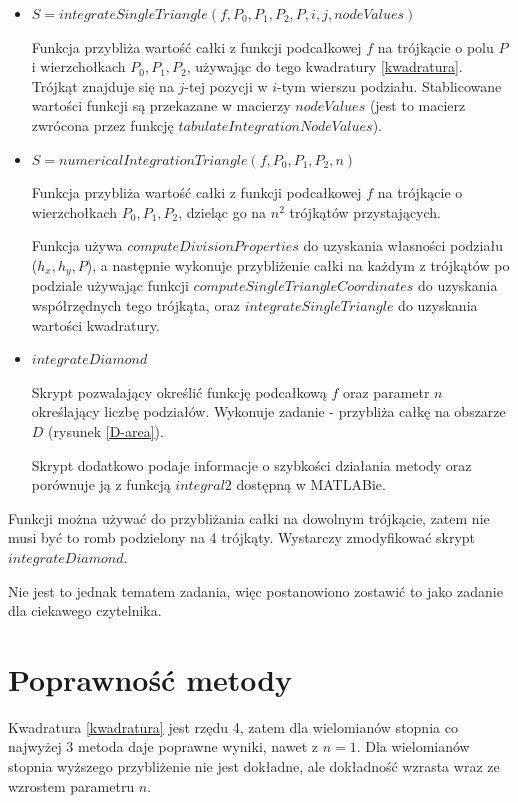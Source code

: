 \documentclass[12pt]{article}
\begin{document}
\begin{itemize}
		
		\item $S = integrateSingleTriangle(f, P_0, P_1, P_2, P, i, j, nodeValues)$
		
		Funkcja przybliża wartość całki z funkcji podcałkowej $f$ na trójkącie o polu $P$ i wierzchołkach $P_0, P_1, P_2$, używając do tego kwadratury \eqref{kwadratura}. Trójkąt znajduje się na $j$-tej pozycji w $i$-tym wierszu podziału. Stablicowane wartości funkcji są przekazane w macierzy $nodeValues$ (jest to macierz zwrócona przez funkcję $tabulateIntegrationNodeValues$).
		
		
		\item $S = numericalIntegrationTriangle(f, P_0, P_1, P_2, n)$
		
		Funkcja przybliża wartość całki z funkcji podcałkowej $f$ na trójkącie o wierzchołkach $P_0, P_1, P_2$, dzieląc go na $n^2$ trójkątów przystających.
		
		Funkcja używa $computeDivisionProperties$ do uzyskania własności podziału ($h_x, h_y, P$), a następnie wykonuje przybliżenie całki na każdym z trójkątów po podziale używając funkcji $computeSingleTriangleCoordinates$ do uzyskania współrzędnych tego trójkąta, oraz $integrateSingleTriangle$ do uzyskania wartości kwadratury.
		
		\item $integrateDiamond$
		
		Skrypt pozwalający określić funkcję podcałkową $f$ oraz parametr $n$ określający liczbę podziałów. Wykonuje zadanie - przybliża całkę na obszarze $D$ (rysunek \ref{D-area}).
		
		Skrypt dodatkowo podaje informacje o szybkości działania metody oraz porównuje ją z funkcją $integral2$ dostępną w MATLABie.
	\end{itemize}

	Funkcji można używać do przybliżania całki na dowolnym trójkącie, zatem nie musi być to romb podzielony na 4 trójkąty. Wystarczy zmodyfikować skrypt $integrateDiamond$.
	
	Nie jest to jednak tematem zadania, więc postanowiono zostawić to jako zadanie dla ciekawego czytelnika.
	
	
	
	
	\section{Poprawność metody}
	Kwadratura \eqref{kwadratura} jest rzędu 4, zatem dla wielomianów stopnia co najwyżej 3 metoda daje poprawne wyniki, nawet z $n = 1$. Dla wielomianów stopnia wyższego przybliżenie nie jest dokładne, ale dokładność wzrasta wraz ze wzrostem parametru $n$.
	
\end{document}
